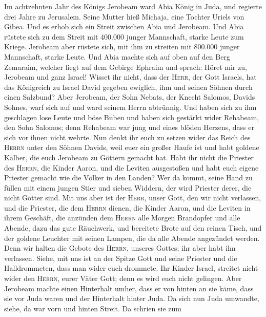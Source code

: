  Im achtzehnten Jahr des Königs Jerobeam ward Abia König
in Juda,  und regierte drei Jahre zu Jerusalem. Seine
Mutter hieß Michaja, eine Tochter Uriels von Gibea. Und es erhob sich
ein Streit zwischen Abia und Jerobeam.  Und Abia rüstete
sich zu dem Streit mit 400.000 junger Mannschaft, starke Leute zum
Kriege. Jerobeam aber rüstete sich, mit ihm zu streiten mit 800.000
junger Mannschaft, starke Leute.  Und Abia machte sich auf
oben auf den Berg Zemaraim, welcher liegt auf dem Gebirge Ephraim und
sprach: Höret mir zu, Jerobeam und ganz Israel!  Wisset
ihr nicht, dass der \textsc{Herr}, der Gott Israels, hat das Königreich
zu Israel David gegeben ewiglich, ihm und seinen Söhnen durch einen
Salzbund?  Aber Jerobeam, der Sohn Nebats, der Knecht
Salomos, Davids Sohnes, warf sich auf und ward seinem Herrn abtrünnig.
 Und haben sich zu ihm geschlagen lose Leute und böse
Buben und haben sich gestärkt wider Rehabeam, den Sohn Salomos; denn
Rehabeam war jung und eines blöden Herzens, dass er sich vor ihnen nicht
wehrte.  Nun denkt ihr euch zu setzen wider das Reich des
\textsc{Herrn} unter den Söhnen Davids, weil euer ein großer Haufe ist
und habt goldene Kälber, die euch Jerobeam zu Göttern gemacht hat.
 Habt ihr nicht die Priester des \textsc{Herrn}, die
Kinder Aaron, und die Leviten ausgestoßen und habt euch eigene Priester
gemacht wie die Völker in den Landen? Wer da kommt, seine Hand zu füllen
mit einem jungen Stier und sieben Widdern, der wird Priester derer, die
nicht Götter sind.  Mit uns aber ist der \textsc{Herr},
unser Gott, den wir nicht verlassen, und die Priester, die dem
\textsc{Herrn} dienen, die Kinder Aaron, und die Leviten in ihrem
Geschäft,  die anzünden dem \textsc{Herrn} alle Morgen
Brandopfer und alle Abende, dazu das gute Räuchwerk, und bereitete Brote
auf den reinen Tisch, und der goldene Leuchter mit seinen Lampen, die da
alle Abende angezündet werden. Denn wir halten die Gebote des
\textsc{Herrn}, unseres Gottes; ihr aber habt ihn verlassen.
 Siehe, mit uns ist an der Spitze Gott und seine Priester
und die Halldrommeten, dass man wider euch drommete. Ihr Kinder Israel,
streitet nicht wider den \textsc{Herrn}, eurer Väter Gott; denn es wird
euch nicht gelingen.  Aber Jerobeam machte einen
Hinterhalt umher, dass er von hinten an sie käme, dass sie vor Juda
waren und der Hinterhalt hinter Juda.  Da sich nun Juda
umwandte, siehe, da war vorn und hinten Streit. Da schrien sie zum
